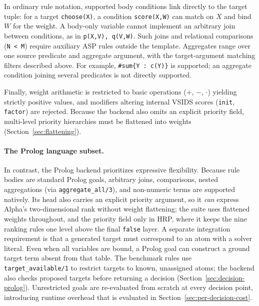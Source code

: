 In ordinary rule notation, supported body conditions link directly to the target tuple: for a target \texttt{choose(X)}, a condition \texttt{score(X,W)} can match on $X$ and bind $W$ for the weight. A body-only variable cannot implement an arbitrary join between conditions, as in \texttt{p(X,V), q(V,W)}. Such joins and relational comparisons (\texttt{N < M}) require auxiliary ASP rules outside the template.
Aggregates range over one source predicate and aggregate argument, with the target-argument matching filters described above. For example, \texttt{\#sum\{Y : c(Y)\}} is supported; an aggregate condition joining several predicates is not directly supported.

Finally, weight arithmetic is restricted to basic operations ($+$, $-$, $\cdot$) yielding strictly positive values, and modifiers altering internal VSIDS scores (\texttt{init}, \texttt{factor}) are rejected. Because the backend also omits an explicit priority field, multi-level priority hierarchies must be flattened into weights (Section~\ref{sec:flattening}).


\paragraph{The Prolog language subset.}
In contrast, the Prolog backend prioritizes expressive flexibility. Because rule bodies are standard Prolog goals, arbitrary joins, comparisons, nested aggregations (via \texttt{aggregate\_all/3}), and non-numeric terms are supported natively. Its head also carries an explicit priority argument, so it \emph{can} express Alpha's two-dimensional rank without weight flattening; the suite uses flattened weights throughout, and the priority field only in HRP, where it keeps the nine ranking rules one level above the final \texttt{false} layer. A separate integration requirement is that a generated target must correspond to an atom with a solver literal. Even when all variables are bound, a Prolog goal can construct a ground target term absent from that table. The benchmark rules use \texttt{target\_available/1} to restrict targets to known, unassigned atoms; the backend also checks proposed targets before returning a decision (Section~\ref{sec:decision-prolog}). Unrestricted goals are re-evaluated from scratch at every decision point, introducing runtime overhead that is evaluated in Section~\ref{sec:per-decision-cost}.

